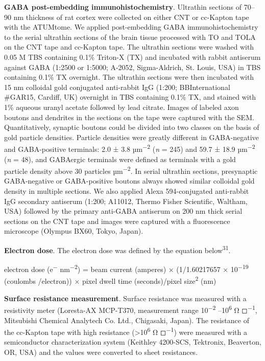 \documentclass{article}
\begin{document}
\textbf{GABA post-embedding immunohistochemistry}. Ultrathin sections of 70–90 nm thickness of rat cortex were collected on either CNT or cc-Kapton tape with the ATUMtome. We applied post-embedding GABA immunohistochemistry to the serial ultrathin sections of the brain tissue processed with TO and TOLA on the CNT tape and cc-Kapton tape. The ultrathin sections were washed with 0.05 M TBS containing 0.1\% Triton-X (TX) and incubated with rabbit antiserum against GABA (1:2500 or 1:5000; A-2052, Sigma-Aldrich, St. Louis, USA) in TBS containing 0.1\% TX overnight. The ultrathin sections were then incubated with 15 nm colloidal gold conjugated anti-rabbit IgG (1:200; BBInternational \#GAR15, Cardiff, UK) overnight in TBS containing 0.1\% TX, and stained with 1\% aqueous uranyl acetate followed by lead citrate. Images of labeled axon boutons and dendrites in the sections on the tape were captured with the SEM. Quantitatively, synaptic boutons could be divided into two classes on the basis of gold particle densities. Particle densities were greatly different in GABA-negative and GABA-positive terminals: 2.0 ± 3.8 µm\textsuperscript{−2} (\emph{n} = 245) and 59.7 ± 18.9 µm\textsuperscript{−2} (\emph{n} = 48), and GABAergic terminals were defined as terminals with a gold particle density above 30 particles µm\textsuperscript{−2}. In serial ultrathin sections, presynaptic GABA-negative or GABA-positive boutons always showed similar colloidal gold density in multiple sections. We also applied Alexa 594-conjugated anti-rabbit IgG secondary antiserum (1:200; A11012, Thermo Fisher Scientific, Waltham, USA) followed by the primary anti-GABA antiserum on 200 nm thick serial sections on the CNT tape and images were captured with a fluorescence microscope (Olympus BX60, Tokyo, Japan).

\textbf{Electron dose}. The electron dose was defined by the equation below\textsuperscript{31}.

electron dose (e\textsuperscript{−} nm\textsuperscript{−2}) = beam current (amperes) × (1/1.60217657 × 10\textsuperscript{−19} (coulombs /electron)) × pixel dwell time (seconds)/pixel size\textsuperscript{2} (nm)

\textbf{Surface resistance measurement}. Surface resistance was measured with a resistivity meter (Loresta-AX MCP-T370, measurement range 10\textsuperscript{−2} –10\textsuperscript{6} Ω ◻\textsuperscript{−1}, Mitsubishi Chemical Analytech Co. Ltd., Chigasaki, Japan). The resistance of the cc-Kapton tape with high resistance (>10\textsuperscript{6} Ω ◻\textsuperscript{−1}) were measured with a semiconductor characterization system (Keithley 4200-SCS, Tektronix, Beaverton, OR, USA) and the values were converted to sheet resistances.
\end{document}
